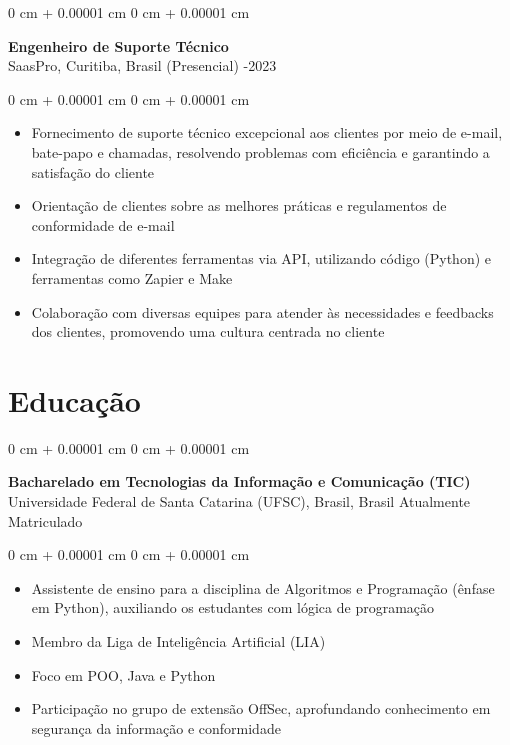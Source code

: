 \documentclass[10pt, letterpaper]{article}
\newenvironment{highlights}{
    \begin{itemize}[
        topsep=0.10 cm,
        parsep=0.10 cm,
        partopsep=0pt,
        itemsep=0pt,
        leftmargin=0 cm + 10pt
    ]
}{
    \end{itemize}
}
\newenvironment{onecolentry}{
    \begin{adjustwidth}{
        0 cm + 0.00001 cm
    }{
        0 cm + 0.00001 cm
    }
}{
    \end{adjustwidth}
}
\begin{document}
\vspace{0.2cm}

\begin{onecolentry}
    \setcolumnwidth{\fill, 4.5cm}
    \begin{paracol}{2}
        \textbf{Engenheiro de Suporte Técnico} \\ SaasPro, Curitiba, Brasil (Presencial)
        \switchcolumn
        -2023
    \end{paracol}
\end{onecolentry}
\vspace{0.10cm}
\begin{onecolentry}
    \begin{highlights}
                \item Fornecimento de suporte técnico excepcional aos clientes por meio de e-mail, bate-papo e chamadas, resolvendo problemas com eficiência e garantindo a satisfação do cliente
                \item Orientação de clientes sobre as melhores práticas e regulamentos de conformidade de e-mail
                \item Integração de diferentes ferramentas via API, utilizando código (Python) e ferramentas como Zapier e Make
                \item Colaboração com diversas equipes para atender às necessidades e feedbacks dos clientes, promovendo uma cultura centrada no cliente
    \end{highlights}
\end{onecolentry}

\section{Educação}

\begin{onecolentry}
    \setcolumnwidth{\fill, 4.5cm}
    \begin{paracol}{2}
        \textbf{Bacharelado em Tecnologias da Informação e Comunicação (TIC)} \\ Universidade Federal de Santa Catarina (UFSC), Brasil, Brasil
        \switchcolumn
        \raggedleft Atualmente Matriculado
    \end{paracol}
\end{onecolentry}
\vspace{0.10cm}
\begin{onecolentry}
    \begin{highlights}
                \item Assistente de ensino para a disciplina de Algoritmos e Programação (ênfase em Python), auxiliando os estudantes com lógica de programação
                \item Membro da Liga de Inteligência Artificial (LIA)
                \item Foco em POO, Java e Python
                \item Participação no grupo de extensão OffSec, aprofundando conhecimento em segurança da informação e conformidade
    \end{highlights}
\end{onecolentry}
\end{document}
